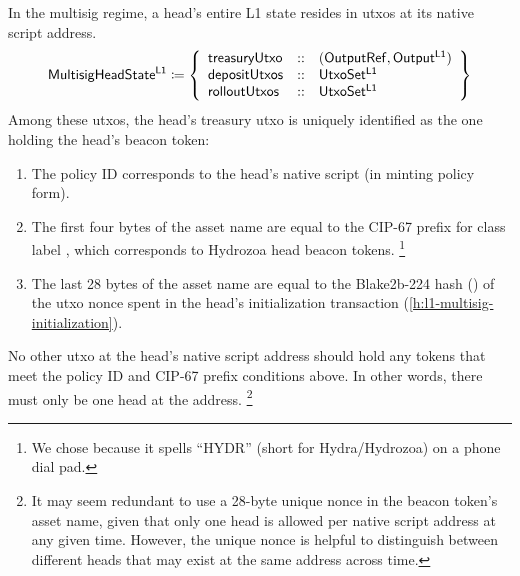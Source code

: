 \documentclass[../hydrozoa.tex]{subfiles}
\begin{document}
In the multisig regime, a head's entire L1 state resides in utxos at its native script address.
\begin{equation*}
  \mathsf{MultisigHeadState^{L1}} \coloneq \left\{
  \begin{array}{lll}
    \mathsf{treasuryUtxo} &::& (\mathsf{OutputRef}, \mathsf{Output^{L1}}) \\
    \mathsf{depositUtxos} &::& \mathsf{UtxoSet^{L1}} \\
    \mathsf{rolloutUtxos} &::& \mathsf{UtxoSet^{L1}}
  \end{array}\right\}
\end{equation*}
Among these utxos, the head's treasury utxo is uniquely identified as the one holding the head's beacon token:
\begin{enumerate}
  \item The policy ID corresponds to the head's native script (in minting policy form).
  \item The first four bytes of the asset name are equal to the CIP-67
    \citep{AlessandroKonradThomasVellekoopCIP67AssetName2022}
    prefix for class label \headBeaconToken{}, which corresponds to Hydrozoa head beacon tokens.%
    \footnote{We chose \headBeaconToken{} because it spells ``HYDR'' (short for Hydra/Hydrozoa) on a phone dial pad.}
  \item The last 28 bytes of the asset name are equal to the Blake2b-224 hash () of the utxo nonce spent in the head's initialization transaction (\cref{h:l1-multisig-initialization}).
\end{enumerate}
No other utxo at the head's native script address should hold any tokens that meet the policy ID and CIP-67 prefix conditions above. In other words, there must only be one head at the address.%
\footnote{It may seem redundant to use a 28-byte unique nonce in the beacon token's asset name, given that only one head is allowed per native script address at any given time.
  However, the unique nonce is helpful to distinguish between different heads that may exist at the same address across time.}
\end{document}
